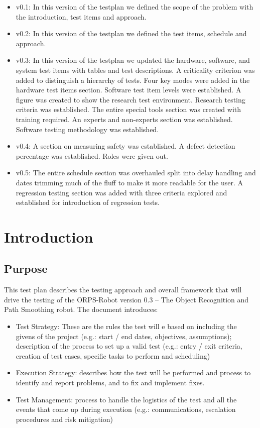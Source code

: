 \documentclass[english,12pt]{article}
\begin{document}
\begin{itemize}
	\item v0.1: In this version of the testplan we defined the  
    scope of the problem with the introduction, test items and 
    approach.
    \item v0.2: In this version of the testplan we defined the  
    test items, schedule and approach.
    \item v0.3: In this version of the testplan we updated 
    the hardware, software, and system test items with 
    tables and test descriptions. A criticality criterion 
    was added to distinguish a hierarchy of tests. Four key 
    modes were added in the hardware test items section. 
    Software test item levels were established. A figure 
    was created to show the research test environment. 
    Research testing criteria was established. The entire 
    special tools section was created with training required.
    An experts and non-experts section was established.
    Software testing methodology was established.
    \item v0.4: A section on measuring safety was established.
    A defect detection percentage was established.
    Roles were given out.
    \item v0.5: The entire schedule section was overhauled split into 
    delay handling and dates trimming much of the fluff to make it more 
    readable for the user. A regression testing section was added with three 
    criteria explored and established for introduction of regression tests.
\end{itemize}


\section{Introduction}
\subsection{Purpose}
This test plan describes the testing approach and overall 
framework that will drive the testing of the ORPS-Robot 
version 0.3 – The Object Recognition and Path Smoothing 
robot. The document introduces:
\begin{itemize}
	\item[] Test Strategy: These are the rules the test will e based on including 
    the givens of the project (e.g.: start / end dates, objectives, assumptions); 
    description of the process to set up a valid test (e.g.: entry / exit criteria, 
    creation of test cases, specific tasks to perform and scheduling)
	\item[] Execution Strategy: describes how the test will be performed 
    and process to identify and report problems, and to fix and implement 
    fixes.
    \item[] Test Management: process to handle the logistics of the test 
    and all the events that come up during execution (e.g.: communications, 
    escalation procedures and risk mitigation)
\end{itemize}
\end{document}
